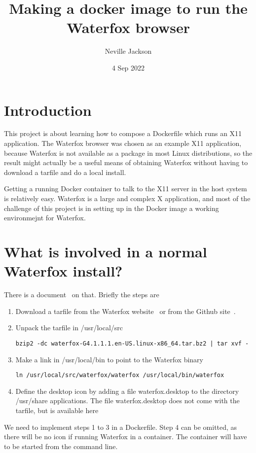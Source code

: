 \documentclass{article}  %
\title{Making a docker image to run the Waterfox browser}
\author{Neville Jackson}
\date{4 Sep 2022}
\begin{document}
 

\maketitle      

\section{Introduction} 
This project is about learning how to compose a Dockerfile which runs an X11 application. The Waterfox browser was chosen as an example X11 application, because Waterfox is not available as a package in most Linux distributions, so the result might actually be a useful means of obtaining Waterfox without having to download a tarfile and do a local install. 

Getting a running Docker container to talk to the X11 server in the host system is relatively easy. Waterfox is a large and complex X application, and most of the challenge of this project is in setting up in the Docker image a working environmejnt for Waterfox. 

\section{What is involved in a normal Waterfox install?}
There is a document~\cite{wate:22a} on that.  Briefly the steps are
\begin{enumerate}
\item Download a tarfile from the Waterfox website~\cite{wate:22} or from the Github site~\cite{wate:22b}.
\item  Unpack the tarfile in /usr/local/src
\begin{verbatim}
bzip2 -dc waterfox-G4.1.1.1.en-US.linux-x86_64.tar.bz2 | tar xvf -
\end{verbatim}
\item Make a link in /usr/local/bin to point to the Waterfox binary
\begin{verbatim}
ln /usr/local/src/waterfox/waterfox /usr/local/bin/waterfox
\end{verbatim}
\item Define the desktop icon by adding a file waterfox.desktop to the directory /usr/share applications. The file waterfox.desktop does not come with the tarfile, but is available here~\cite{wate:22a}
\end{enumerate}
We need to implement steps 1 to 3 in a Dockerfile. Step 4 can be omitted, as there will be no icon if running Waterfox in a container. The container will have to be started from the command line.
\end{document}
